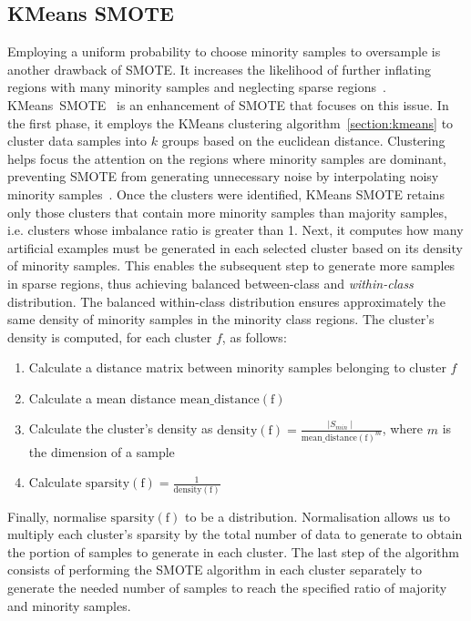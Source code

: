 \subsection{KMeans SMOTE}
\label{subsection:kmeans-smote}

Employing a uniform probability to choose minority samples to oversample is another drawback of
SMOTE. It increases the likelihood of further inflating regions with many minority samples and
neglecting sparse regions~\cite{kmeans-smote}. KMeans~SMOTE~\cite{kmeans-smote} is an enhancement
of SMOTE that focuses on this issue. In the first phase, it employs the KMeans clustering
algorithm~\ref{section:kmeans} to cluster data samples into $k$ groups based on the euclidean
distance. Clustering helps focus the attention on the regions where minority samples are dominant,
preventing SMOTE from generating unnecessary noise by interpolating noisy minority
samples~\cite{kmeans-smote}. Once the clusters were identified, KMeans SMOTE retains only those
clusters that contain more minority samples than majority samples, i.e. clusters whose imbalance
ratio is greater than 1. Next, it computes how many artificial examples must be generated in each
selected cluster based on its density of minority samples. This enables the subsequent step to
generate more samples in sparse regions, thus achieving balanced between-class and
\emph{within-class} distribution. The balanced within-class distribution ensures approximately the
same density of minority samples in the minority class regions. The cluster's density is computed,
for each cluster $f$, as follows:

\begin{enumerate}
    \item Calculate a distance matrix between minority samples belonging to cluster $f$
    \item Calculate a mean distance $\mathrm{mean\_distance(f)}$
    \item Calculate the cluster's density as $\mathrm{density(f)} = \frac{\mid S_{min}
        \mid}{\mathrm{mean\_distance(f)}^m}$, where $m$ is the dimension of a sample
    \item Calculate $\mathrm{sparsity(f)} = \frac{1}{\mathrm{density(f)}}$
\end{enumerate}

Finally, normalise $\mathrm{sparsity(f)}$ to be a distribution. Normalisation allows us to multiply
each cluster's sparsity by the total number of data to generate to obtain the portion of samples to
generate in each cluster. The last step of the algorithm consists of performing the SMOTE algorithm
in each cluster separately to generate the needed number of samples to reach the specified ratio of
majority and minority samples.

